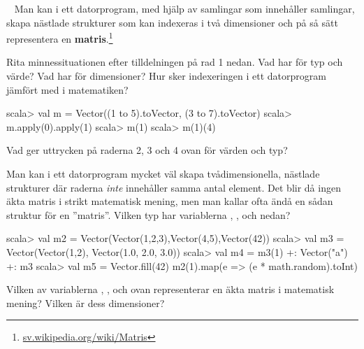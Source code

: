 \begin{ConceptConnections}

\end{ConceptConnections}

\QUESTEND





\QUESTBEGIN

\Task  \what~  Man kan i ett datorprogram, med hjälp av samlingar som innehåller samlingar, skapa nästlade strukturer som kan indexeras i två dimensioner och på så sätt representera en  \textbf{matris}.\footnote{\href{https://sv.wikipedia.org/wiki/Matris}{sv.wikipedia.org/wiki/Matris}}

\Subtask Rita minnessituationen efter tilldelningen på rad 1 nedan. Vad har  för typ och värde? Vad har  för dimensioner? Hur sker indexeringen i ett datorprogram jämfört med i matematiken?

\begin{REPL}
scala> val m = Vector((1 to 5).toVector, (3 to 7).toVector)
scala> m.apply(0).apply(1)
scala> m(1)
scala> m(1)(4)
\end{REPL}

\Subtask Vad ger uttrycken på raderna 2, 3 och 4 ovan för värden och typ?

\Subtask Man kan i ett datorprogram mycket väl skapa tvådimensionella, nästlade strukturer där raderna \emph{inte} innehåller samma antal element. Det blir då ingen äkta matris i strikt matematisk mening, men man kallar ofta ändå en sådan struktur för en ''matris''. Vilken typ har variablerna , ,  och  nedan?

\begin{REPL}
scala> val m2 = Vector(Vector(1,2,3),Vector(4,5),Vector(42))
scala> val m3 = Vector(Vector(1,2), Vector(1.0, 2.0, 3.0))
scala> val m4 = m3(1) +: Vector("a") +: m3
scala> val m5 = Vector.fill(42){ m2(1).map(e => (e * math.random).toInt) }
\end{REPL}

\Subtask Vilken av variablerna , ,  och  ovan representerar en äkta matris i matematisk mening? Vilken är dess dimensioner?

\SOLUTION

\TaskSolved \what

